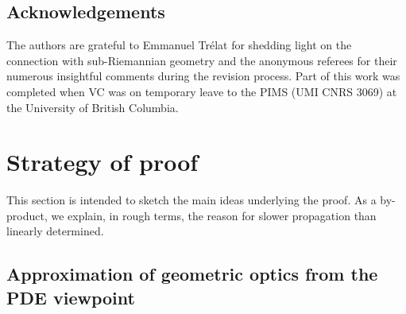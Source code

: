 \documentclass[10pt]{amsart}
\theoremstyle{definition}\newtheorem{defi}[theo]{Definition}\newtheorem{rema}[theo]{Remark}\newtheorem{exam}[theo]{Example}\newtheorem{exem}[theo]{Example}\newtheorem{nota}[theo]{Notation}
\newcommand{\1}{\mathds{1}}
\begin{document}
\subsection*{Acknowledgements}
The authors are grateful to Emmanuel Trélat for shedding light on the connection with sub-Riemannian geometry and the anonymous referees for their numerous insightful comments during the revision process. Part of this work was completed when VC was on temporary leave to the PIMS (UMI CNRS 3069) at the University of British Columbia.



\section{Strategy of proof}\label{sec:strategy}

This section is intended to sketch the main ideas underlying the proof. As a by-product, we explain, in rough terms, the reason for slower propagation than linearly determined.


\subsection*{Approximation of geometric optics from the PDE viewpoint}
\end{document}
